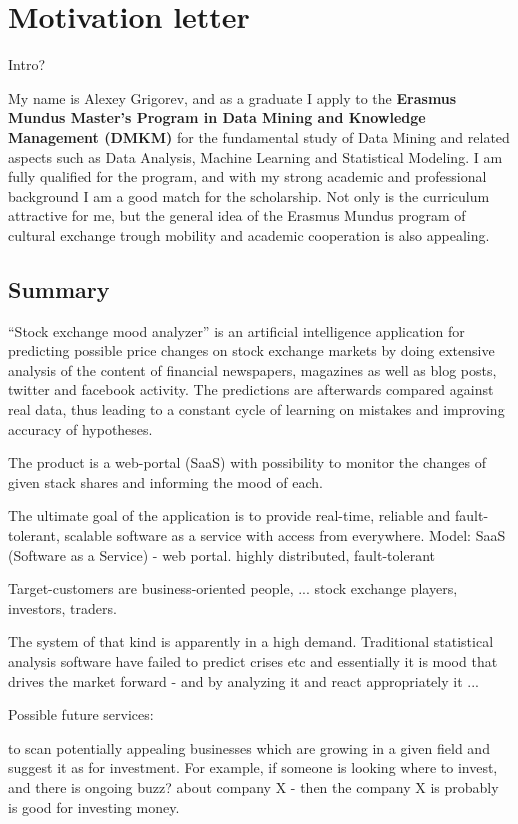\documentclass[a4paper,12pt]{article}
\begin{document}
\section*{Motivation letter}

Intro?

My name is Alexey Grigorev, and as a graduate I apply to the \textbf{Erasmus Mundus Master's Program in Data Mining and Knowledge Management (DMKM)} for the fundamental study of Data Mining and related aspects such as Data Analysis, Machine Learning and Statistical Modeling. I am fully qualified for the program, and with my strong academic and professional background I am a good match for the scholarship. Not only is the curriculum attractive for me, but the general idea of the Erasmus Mundus program of cultural exchange trough mobility and academic cooperation is also appealing.

\subsection*{Summary}

``Stock exchange mood analyzer'' is an artificial intelligence application for predicting possible price changes on stock exchange markets by doing extensive analysis of the content of financial newspapers, magazines as well as blog posts, twitter and facebook activity. The predictions are afterwards compared against real data, thus leading to a constant cycle of learning on mistakes and improving accuracy of hypotheses.

The product is a web-portal (SaaS) with possibility to monitor the changes of given stack shares and informing the mood of each.

The ultimate goal of the application is to provide real-time, reliable and fault-tolerant, scalable software as a service with access from everywhere.
Model: SaaS (Software as a Service) - web portal.
highly distributed, fault-tolerant

Target-customers are business-oriented people, ... stock exchange players, investors, traders.

The system of that kind is apparently in a high demand. Traditional statistical analysis software have failed to predict crises etc and essentially it is mood that drives the market forward - and by analyzing it and react appropriately it ...

Possible future services:

to scan potentially appealing businesses which are growing in a given field and suggest it as for investment. For example, if someone is looking where to invest, and there is ongoing buzz? about company X - then the company X is probably is good for investing money.
\end{document}
